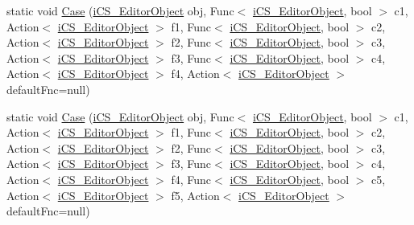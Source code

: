 \begin{DoxyCompactItemize}
\item 
static void \hyperlink{classi_c_s___i_storage_aa31762a0794995609620f92487c3219b}{Case} (\hyperlink{classi_c_s___editor_object}{i\+C\+S\+\_\+\+Editor\+Object} obj, Func$<$ \hyperlink{classi_c_s___editor_object}{i\+C\+S\+\_\+\+Editor\+Object}, bool $>$ c1, Action$<$ \hyperlink{classi_c_s___editor_object}{i\+C\+S\+\_\+\+Editor\+Object} $>$ f1, Func$<$ \hyperlink{classi_c_s___editor_object}{i\+C\+S\+\_\+\+Editor\+Object}, bool $>$ c2, Action$<$ \hyperlink{classi_c_s___editor_object}{i\+C\+S\+\_\+\+Editor\+Object} $>$ f2, Func$<$ \hyperlink{classi_c_s___editor_object}{i\+C\+S\+\_\+\+Editor\+Object}, bool $>$ c3, Action$<$ \hyperlink{classi_c_s___editor_object}{i\+C\+S\+\_\+\+Editor\+Object} $>$ f3, Func$<$ \hyperlink{classi_c_s___editor_object}{i\+C\+S\+\_\+\+Editor\+Object}, bool $>$ c4, Action$<$ \hyperlink{classi_c_s___editor_object}{i\+C\+S\+\_\+\+Editor\+Object} $>$ f4, Action$<$ \hyperlink{classi_c_s___editor_object}{i\+C\+S\+\_\+\+Editor\+Object} $>$ default\+Fnc=null)
\item 
static void \hyperlink{classi_c_s___i_storage_a97be58cfb9dc458daeffe33d485a415c}{Case} (\hyperlink{classi_c_s___editor_object}{i\+C\+S\+\_\+\+Editor\+Object} obj, Func$<$ \hyperlink{classi_c_s___editor_object}{i\+C\+S\+\_\+\+Editor\+Object}, bool $>$ c1, Action$<$ \hyperlink{classi_c_s___editor_object}{i\+C\+S\+\_\+\+Editor\+Object} $>$ f1, Func$<$ \hyperlink{classi_c_s___editor_object}{i\+C\+S\+\_\+\+Editor\+Object}, bool $>$ c2, Action$<$ \hyperlink{classi_c_s___editor_object}{i\+C\+S\+\_\+\+Editor\+Object} $>$ f2, Func$<$ \hyperlink{classi_c_s___editor_object}{i\+C\+S\+\_\+\+Editor\+Object}, bool $>$ c3, Action$<$ \hyperlink{classi_c_s___editor_object}{i\+C\+S\+\_\+\+Editor\+Object} $>$ f3, Func$<$ \hyperlink{classi_c_s___editor_object}{i\+C\+S\+\_\+\+Editor\+Object}, bool $>$ c4, Action$<$ \hyperlink{classi_c_s___editor_object}{i\+C\+S\+\_\+\+Editor\+Object} $>$ f4, Func$<$ \hyperlink{classi_c_s___editor_object}{i\+C\+S\+\_\+\+Editor\+Object}, bool $>$ c5, Action$<$ \hyperlink{classi_c_s___editor_object}{i\+C\+S\+\_\+\+Editor\+Object} $>$ f5, Action$<$ \hyperlink{classi_c_s___editor_object}{i\+C\+S\+\_\+\+Editor\+Object} $>$ default\+Fnc=null)
\item 

\end{DoxyCompactItemize}
